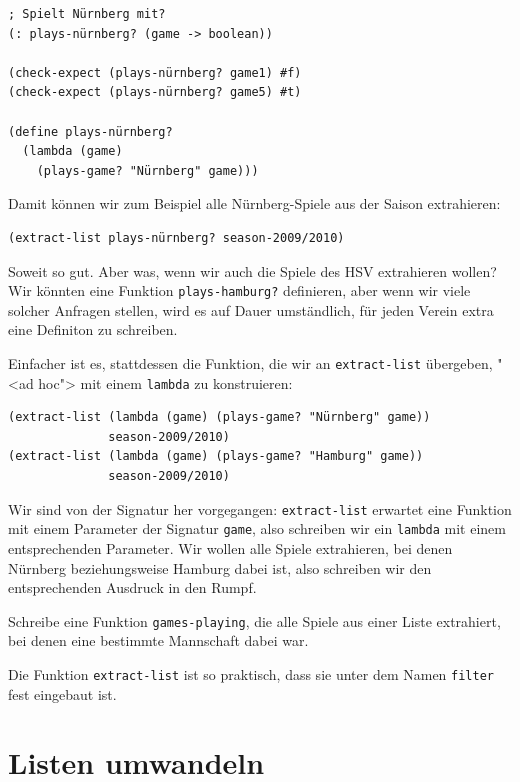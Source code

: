 \begin{lstlisting}
; Spielt Nürnberg mit?
(: plays-nürnberg? (game -> boolean))

(check-expect (plays-nürnberg? game1) #f)
(check-expect (plays-nürnberg? game5) #t)

(define plays-nürnberg?
  (lambda (game)
    (plays-game? "Nürnberg" game)))
\end{lstlisting}
%
Damit können wir zum Beispiel alle Nürnberg-Spiele aus der Saison
extrahieren:
%
\begin{lstlisting}
(extract-list plays-nürnberg? season-2009/2010)
\end{lstlisting}
%
Soweit so gut.  Aber was, wenn wir auch die Spiele des HSV extrahieren
wollen?  Wir könnten eine Funktion \lstinline{plays-hamburg?}
definieren, aber wenn wir viele solcher Anfragen stellen, wird es auf
Dauer umständlich, für jeden Verein extra eine Definiton zu schreiben.

Einfacher ist es, stattdessen die Funktion, die wir an
\lstinline{extract-list} übergeben, "<ad hoc"> mit einem
\lstinline{lambda} zu konstruieren:\label{code:extract-list-plays-game}
%
\begin{lstlisting}
(extract-list (lambda (game) (plays-game? "Nürnberg" game)) 
              season-2009/2010)
(extract-list (lambda (game) (plays-game? "Hamburg" game)) 
              season-2009/2010)
\end{lstlisting}
%
Wir sind von der Signatur her vorgegangen: \lstinline{extract-list}
erwartet eine Funktion mit einem Parameter der Signatur
\lstinline{game}, also schreiben wir ein \lstinline{lambda} mit einem
entsprechenden Parameter.  Wir wollen alle Spiele extrahieren, bei
denen Nürnberg beziehungsweise Hamburg dabei ist, also schreiben wir
den entsprechenden Ausdruck in den Rumpf.
%
\begin{aufgabeinline}
  Schreibe eine Funktion \lstinline{games-playing}, die alle Spiele
  aus einer Liste extrahiert, bei denen eine bestimmte Mannschaft dabei war.
\end{aufgabeinline}
%
Die Funktion \lstinline{extract-list} ist so praktisch, dass sie unter
dem Namen \lstinline{filter} fest
eingebaut ist.\label{func:filter}

\section{Listen umwandeln}


